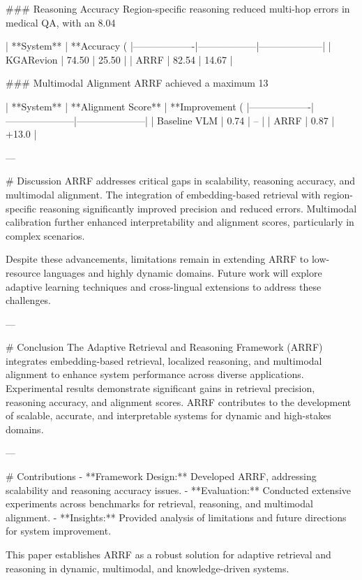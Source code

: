 ### Reasoning Accuracy  
Region-specific reasoning reduced multi-hop errors in medical QA, with an 8.04%

| **System**       | **Accuracy (%
|-------------------|------------------|--------------------|  
| KGARevion        | 74.50            | 25.50              |  
| ARRF             | 82.54            | 14.67              |  

### Multimodal Alignment  
ARRF achieved a maximum 13%

| **System**       | **Alignment Score** | **Improvement (%
|-------------------|---------------------|---------------------|  
| Baseline VLM     | 0.74                | --                  |  
| ARRF             | 0.87                | +13.0               |

---

# Discussion  
ARRF addresses critical gaps in scalability, reasoning accuracy, and multimodal alignment. The integration of embedding-based retrieval with region-specific reasoning significantly improved precision and reduced errors. Multimodal calibration further enhanced interpretability and alignment scores, particularly in complex scenarios.

Despite these advancements, limitations remain in extending ARRF to low-resource languages and highly dynamic domains. Future work will explore adaptive learning techniques and cross-lingual extensions to address these challenges.

---

# Conclusion  
The Adaptive Retrieval and Reasoning Framework (ARRF) integrates embedding-based retrieval, localized reasoning, and multimodal alignment to enhance system performance across diverse applications. Experimental results demonstrate significant gains in retrieval precision, reasoning accuracy, and alignment scores. ARRF contributes to the development of scalable, accurate, and interpretable systems for dynamic and high-stakes domains.

---

# Contributions  
- **Framework Design:** Developed ARRF, addressing scalability and reasoning accuracy issues.  
- **Evaluation:** Conducted extensive experiments across benchmarks for retrieval, reasoning, and multimodal alignment.  
- **Insights:** Provided analysis of limitations and future directions for system improvement.  

This paper establishes ARRF as a robust solution for adaptive retrieval and reasoning in dynamic, multimodal, and knowledge-driven systems.